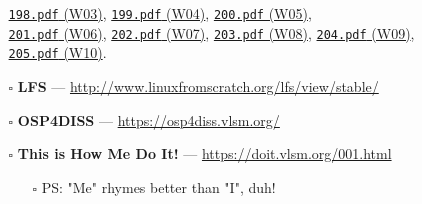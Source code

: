 \begin{frame}[fragile]
\begin{itemize}
\begin{itemize}
{                 \href{https://rms46.vlsm.org/2/198.pdf}{\texttt{198.pdf} (W03)},
                 \href{https://rms46.vlsm.org/2/199.pdf}{\texttt{199.pdf} (W04)},
                 \href{https://rms46.vlsm.org/2/200.pdf}{\texttt{200.pdf} (W05)},\\
                 \href{https://rms46.vlsm.org/2/201.pdf}{\texttt{201.pdf} (W06)},
                 \href{https://rms46.vlsm.org/2/202.pdf}{\texttt{202.pdf} (W07)},
                 \href{https://rms46.vlsm.org/2/203.pdf}{\texttt{203.pdf} (W08)},
                 \href{https://rms46.vlsm.org/2/204.pdf}{\texttt{204.pdf} (W09)},
                 \href{https://rms46.vlsm.org/2/205.pdf}{\texttt{205.pdf} (W10)}.}
\item[$\square$] \textbf{LFS} --- \url{http://www.linuxfromscratch.org/lfs/view/stable/}
\item[$\square$] \textbf{OSP4DISS} --- \url{https://osp4diss.vlsm.org/}
\item[$\square$] \textbf{This is How Me Do It!} --- \url{https://doit.vlsm.org/001.html}
\begin{itemize}
\item[$\square$] PS: "Me" rhymes better than "I", duh!
\end{itemize}
\end{itemize}
\end{itemize}
\end{frame}

